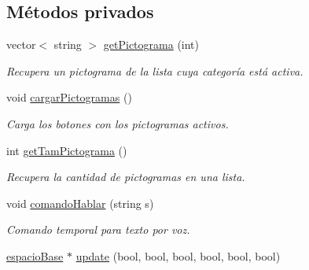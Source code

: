 \subsection*{Métodos privados}
\begin{DoxyCompactItemize}
\item 
vector$<$ string $>$ \hyperlink{classespacio_pictograma_a298954d50054dbfe58cccb1b6b0f704d}{get\+Pictograma} (int)
\begin{DoxyCompactList}\small\item\em Recupera un pictograma de la lista cuya categoría está activa. \end{DoxyCompactList}\item 
void \hyperlink{classespacio_pictograma_abfadb8b3f6ec9c8c7558ea6eef22b295}{cargar\+Pictogramas} ()
\begin{DoxyCompactList}\small\item\em Carga los botones con los pictogramas activos. \end{DoxyCompactList}\item 
int \hyperlink{classespacio_pictograma_aa1d237a0781e86d2cc44c65c0c500d28}{get\+Tam\+Pictograma} ()
\begin{DoxyCompactList}\small\item\em Recupera la cantidad de pictogramas en una lista. \end{DoxyCompactList}\item 
void \hyperlink{classespacio_pictograma_a3a9c44580cc4f78eb1793c9479b89e9f}{comando\+Hablar} (string s)
\begin{DoxyCompactList}\small\item\em Comando temporal para texto por voz. \end{DoxyCompactList}\item 
\hyperlink{classespacio_base}{espacio\+Base} $\ast$ \hyperlink{classespacio_pictograma_a845a704901e4e675d3d871f987193fc2}{update} (bool, bool, bool, bool, bool, bool)
\end{DoxyCompactItemize}
